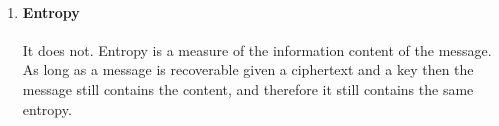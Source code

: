 \documentclass{article}
\begin{document}
\begin{enumerate}
\item \hfill 
  \paragraph{Entropy}{It does not. Entropy is a measure of the information content of the message. As long as a message is recoverable given a ciphertext and a key then the message still contains the content, and therefore it still contains the same entropy.}
\end{enumerate}
\end{document}
